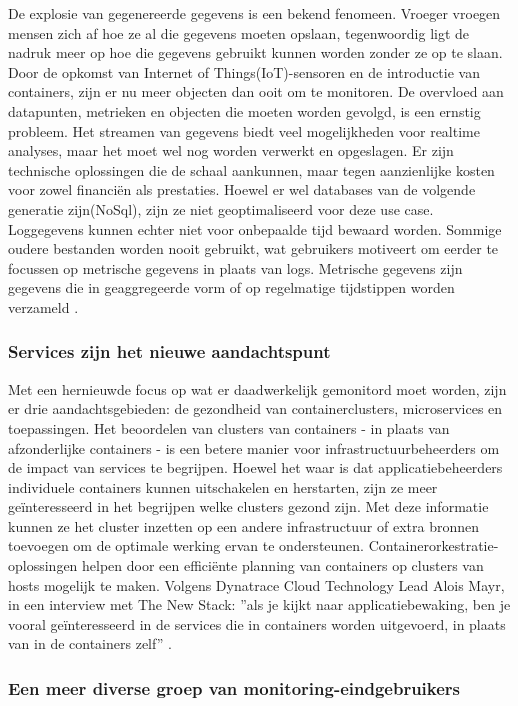 De explosie van gegenereerde gegevens is een bekend fenomeen. Vroeger vroegen mensen zich af hoe ze al die gegevens moeten opslaan, tegenwoordig ligt de nadruk meer op hoe die gegevens gebruikt kunnen worden zonder ze op te slaan. Door de opkomst van Internet of Things(IoT)-sensoren en de introductie van containers, zijn er nu meer objecten dan ooit om te monitoren. De overvloed aan datapunten, metrieken en objecten die moeten worden gevolgd, is een ernstig probleem. Het streamen van gegevens biedt veel mogelijkheden voor realtime analyses, maar het moet wel nog worden verwerkt en opgeslagen. Er zijn technische oplossingen die de schaal aankunnen, maar tegen aanzienlijke kosten voor zowel financiën als prestaties. Hoewel er wel databases van de volgende generatie zijn(NoSql), zijn ze niet geoptimaliseerd voor deze use case. Loggegevens kunnen echter niet voor onbepaalde tijd bewaard worden. Sommige oudere bestanden worden nooit gebruikt, wat gebruikers motiveert om eerder te focussen op metrische gegevens in plaats van logs. Metrische gegevens zijn gegevens die in geaggregeerde vorm of op regelmatige tijdstippen worden verzameld \autocite{Williams2016}.

\subsubsection{Services zijn het nieuwe aandachtspunt}

Met een hernieuwde focus op wat er daadwerkelijk gemonitord moet worden, zijn er drie aandachtsgebieden: de gezondheid van containerclusters, microservices en toepassingen. Het beoordelen van clusters van containers - in plaats van afzonderlijke containers - is een betere manier voor infrastructuurbeheerders om de impact van services te begrijpen. Hoewel het waar is dat applicatiebeheerders individuele containers kunnen uitschakelen en herstarten, zijn ze meer geïnteresseerd in het begrijpen welke clusters gezond zijn. Met deze informatie kunnen ze het cluster inzetten op een andere infrastructuur of extra bronnen toevoegen om de optimale werking ervan te ondersteunen. Containerorkestratie-oplossingen helpen door een efficiënte planning van containers op clusters van hosts mogelijk te maken. Volgens Dynatrace Cloud Technology Lead Alois Mayr, in een interview met The New Stack: ''als je kijkt naar applicatiebewaking, ben je vooral geïnteresseerd in de services die in containers worden uitgevoerd, in plaats van in de containers zelf'' \autocite{Williams2016}.

\subsubsection{Een meer diverse groep van monitoring-eindgebruikers}

